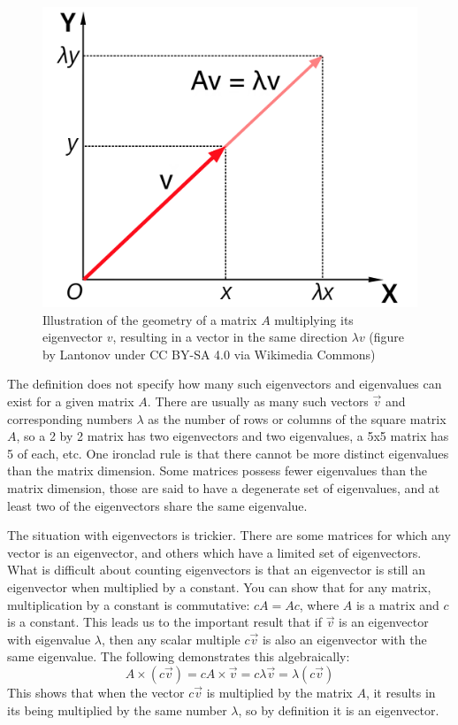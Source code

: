 \documentclass[
  letterpaper,
  DIV=11,
  numbers=noendperiod]{scrreprt}
\begin{document}
\begin{figure}

{\centering \includegraphics{./ch13/Eigenvalue_equation.png}

}

\caption{Illustration of the geometry of a matrix \(A\) multiplying its
eigenvector \(v\), resulting in a vector in the same direction
\(\lambda v\) (figure by Lantonov under CC BY-SA 4.0 via Wikimedia
Commons)}

\end{figure}

The definition does not specify how many such eigenvectors and
eigenvalues can exist for a given matrix \(A\). There are usually as
many such vectors \(\vec v\) and corresponding numbers \(\lambda\) as
the number of rows or columns of the square matrix \(A\), so a 2 by 2
matrix has two eigenvectors and two eigenvalues, a 5x5 matrix has 5 of
each, etc. One ironclad rule is that there cannot be more distinct
eigenvalues than the matrix dimension. Some matrices possess fewer
eigenvalues than the matrix dimension, those are said to have a
degenerate set of eigenvalues, and at least two of the eigenvectors
share the same eigenvalue.

The situation with eigenvectors is trickier. There are some matrices for
which any vector is an eigenvector, and others which have a limited set
of eigenvectors. What is difficult about counting eigenvectors is that
an eigenvector is still an eigenvector when multiplied by a constant.
You can show that for any matrix, multiplication by a constant is
commutative: \(cA = Ac\), where \(A\) is a matrix and \(c\) is a
constant. This leads us to the important result that if \(\vec v\) is an
eigenvector with eigenvalue \(\lambda\), then any scalar multiple
\(c \vec v\) is also an eigenvector with the same eigenvalue. The
following demonstrates this algebraically:
\[ A  \times  (c \vec v) = c A  \times  \vec v = c \lambda \vec v =  \lambda (c \vec v) \]
This shows that when the vector \(c \vec v\) is multiplied by the matrix
\(A\), it results in its being multiplied by the same number
\(\lambda\), so by definition it is an eigenvector.
\end{document}
